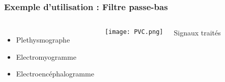 \documentclass{beamer}
\begin{document}
\begin{frame}
\frametitle{Exemple d'utilisation : Filtre passe-bas}
\begin{columns}
\column{60mm}
\begin{itemize}
\item Plethysmographe 
\vspace{1cm}
\item Electromyogramme 
\vspace{1cm}
\item Electroencéphalogramme
\end{itemize}
\vspace{0.6cm}
\column{60mm}
\texttt{[image: PVC.png]}
\\ \begin{center}
Signaux traités 
\end{center}


\end{columns}
\end{frame}
\end{document}
